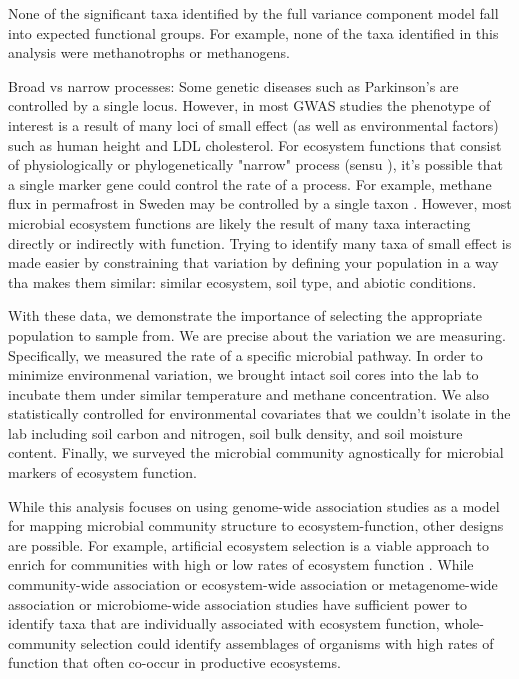 \documentclass{article}
\begin{document}
None of the significant taxa identified by the full variance component model 
fall into expected functional groups. For example, none of the taxa identified
in this analysis were methanotrophs or methanogens.

Broad vs narrow processes: Some genetic diseases such as Parkinson's 
are controlled by a single locus. However, in most GWAS studies the phenotype of
interest is a result of many loci of small effect (as well as environmental
factors) such as human height and LDL cholesterol. For ecosystem functions that
consist of physiologically or phylogenetically "narrow" process (sensu
\cite{schimel1995b}), it's possible that a single marker gene could control the
rate of a process. For example, methane flux in permafrost in Sweden may be
controlled by a single taxon \citep{mccalley2014}. However, most microbial ecosystem functions are likely the result
of many taxa interacting directly or indirectly with function.
Trying to identify many taxa of small effect is made easier by constraining that
variation by defining your population in a way tha makes them similar: 
similar ecosystem, soil type, and abiotic conditions.

With these data, we demonstrate the
importance of selecting the appropriate population to sample from. We are
precise about the variation we are measuring. Specifically, we measured the rate
of a specific microbial pathway. In order to minimize environmenal variation, we
brought intact soil cores into the lab to incubate them under similar
temperature and methane concentration. We also statistically controlled for
environmental covariates that we couldn't isolate in the lab including soil
carbon and nitrogen, soil bulk density, and soil moisture content. Finally, we
surveyed the microbial community agnostically for microbial markers of ecosystem
function.

While this analysis focuses on using genome-wide association studies as a model
for mapping microbial community structure to ecosystem-function, other designs
are possible. For example, artificial ecosystem selection is a viable approach
to enrich for communities with high or low rates of ecosystem function
\citep{swenson2000, panke-buisse2015}. While community-wide association or
ecosystem-wide association or metagenome-wide association or microbiome-wide
association studies have sufficient power to identify taxa that are individually
associated with ecosystem function, whole-community selection could identify
assemblages of organisms with high rates of function that often co-occur in
productive ecosystems.
\end{document}
